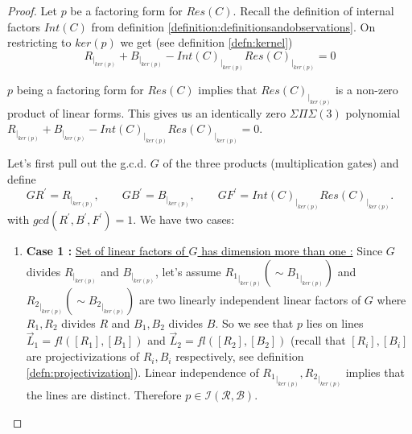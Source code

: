 \documentclass[12pt]{caltech_thesis}
\theoremstyle{plain}
\theoremstyle{definition}
\newcommand{\MB}{\mathcal{B}}
\newcommand{\MR}{\mathcal{R}}
\newcommand{\MI}{\mathcal{I}}
\begin{document}
\begin{proof}
 
Let $p$ be a factoring form for $Res(C)$.
Recall the definition of internal factors $Int(C)$ from definition \ref{definition:definitionsandobservations}. On restricting to $ker(p)$ we get
(see definition \ref{defn:kernel})
\begin{equation}\label{equation:simple}
 R_{|_{ker(p)}} + B_{|_{ker(p)}} - Int(C)_{|_{ker(p)}} Res(C)_{|_{ker(p)}} = 0
\end{equation}

$p$ being a factoring form for $Res(C)$ implies that $Res(C)_{|_{ker(p)}}$ is a non-zero product of linear forms.  
This gives us an identically
zero $\Sigma\Pi\Sigma(3)$ polynomial $R_{|_{ker(p)}} + B_{|_{ker(p)}} - Int(C)_{|_{ker(p)}} Res(C)_{|_{ker(p)}} = 0$. 

Let's first pull out the g.c.d. $G$ of the three products (multiplication gates) and define
\[
GR^\prime = R_{|_{ker(p)}}, \hspace{2em} GB^\prime = B_{|_{ker(p)}}, \hspace{2em} GF^\prime = Int(C)_{|_{ker(p)}}Res(C)_{|_{ker(p)}}.
\]
with $gcd(R^\prime,B^\prime,F^\prime)=1$. We have two cases:
\begin{enumerate}
 \item \textbf{Case 1 :} \underline{Set of   linear factors of $G$ has dimension more than one :} 
 Since $G$ divides $R_{|_{ker(p)}}$ and $B_{|_{ker(p)}}$, let's assume
 ${R_1}_{|_{ker(p)}} ( \sim {B_1}_{|_{ker(p)}})$ and ${R_2}_{|_{ker(p)}} (\sim {B_2}_{|_{ker(p)}})$ are two 
 linearly independent linear factors of $G$  where
 $R_1,R_2$ divides $R$ and $B_1,B_2$ divides $B$. So we see that $p$ lies on lines 
 $\vec L_1 = fl([R_1],[B_1])$ and $\vec L_2 = fl([R_2],[B_2])$ (recall that $[R_i],[B_i]$ are projectivizations of $R_i,B_i$
 respectively, see definition \ref{defn:projectivization}). Linear independence of  
 ${R_1}_{|_{ker(p)}}, {R_2}_{|_{ker(p)}}$ implies that the lines are distinct. Therefore $p \in \MI(\MR,\MB)$.


\end{enumerate}
\end{proof}
\end{document}
